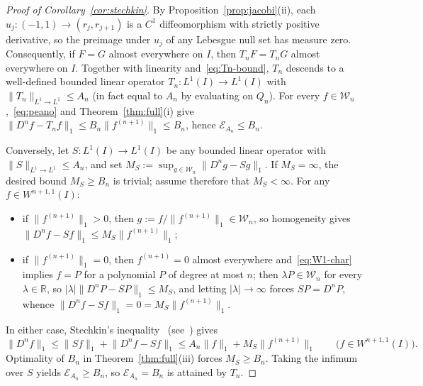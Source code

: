 \documentclass[11pt,a4paper]{article}
\newcommand{\R}{\mathbb{R}}
\newcommand{\Lone}[1]{\lVert #1\rVert_1}
\theoremstyle{remark}
\numberwithin{equation}{section}
\begin{document}
\begin{proof}[Proof of Corollary~\ref{cor:stechkin}]
By Proposition~\ref{prop:jacobi}(ii), each $u_j : (-1,1) \to (r_j, r_{j+1})$ is a $C^1$ diffeomorphism with strictly positive derivative, so the preimage under $u_j$ of any Lebesgue null set has measure zero. Consequently, if $F = G$ almost everywhere on $I$, then $T_n F = T_n G$ almost everywhere on $I$. Together with linearity and~\eqref{eq:Tn-bound}, $T_n$ descends to a well-defined bounded linear operator $T_n : L^1(I) \to L^1(I)$ with $\lVert T_n\rVert_{L^1 \to L^1} \le A_n$ (in fact equal to $A_n$ by evaluating on $Q_n$). For every $f \in \mathcal{W}_n$,~\eqref{eq:peano} and Theorem~\ref{thm:full}(i) give $\Lone{D^n f - T_n f} \le B_n \Lone{f^{(n+1)}} \le B_n$, hence $\mathcal{E}_{A_n} \le B_n$.

Conversely, let $S : L^1(I) \to L^1(I)$ be any bounded linear operator with $\lVert S\rVert_{L^1 \to L^1} \le A_n$, and set $M_S := \sup_{g \in \mathcal{W}_n} \Lone{D^n g - Sg}$. If $M_S = \infty$, the desired bound $M_S \ge B_n$ is trivial; assume therefore that $M_S < \infty$. For any $f \in W^{n+1,1}(I)$:
\begin{itemize}[leftmargin=1.8em]
    \item if $\Lone{f^{(n+1)}} > 0$, then $g := f/\Lone{f^{(n+1)}} \in \mathcal{W}_n$, so homogeneity gives $\Lone{D^n f - Sf} \le M_S\Lone{f^{(n+1)}}$;
    \item if $\Lone{f^{(n+1)}} = 0$, then $f^{(n+1)} = 0$ almost everywhere and~\eqref{eq:W1-char} implies $f = P$ for a polynomial $P$ of degree at most $n$; then $\lambda P \in \mathcal{W}_n$ for every $\lambda \in \R$, so $|\lambda|\Lone{D^n P - SP} \le M_S$, and letting $|\lambda| \to \infty$ forces $SP = D^n P$, whence $\Lone{D^n f - Sf} = 0 = M_S\Lone{f^{(n+1)}}$.
\end{itemize}
In either case, Stechkin's inequality~\cite{Stechkin1967} (see~\cite[Proposition~2]{Skorokhodov2019}) gives
\[
    \Lone{D^n f} \le \Lone{Sf} + \Lone{D^n f - Sf}
    \le A_n\Lone{f} + M_S\Lone{f^{(n+1)}}
    \qquad \bigl(f \in W^{n+1,1}(I)\bigr).
\]
Optimality of $B_n$ in Theorem~\ref{thm:full}(iii) forces $M_S \ge B_n$. Taking the infimum over $S$ yields $\mathcal{E}_{A_n} \ge B_n$, so $\mathcal{E}_{A_n} = B_n$ is attained by $T_n$.
\end{proof}
\end{document}
